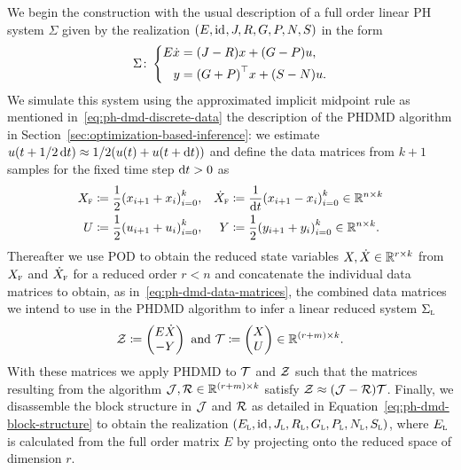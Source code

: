 We begin the construction with the usual description of a full order linear \ac{PH} system $\Sigma$ given by the realization $(E, \text{id}_{}, J, R, G, P, N, S)$ in the form
\begin{equation*}
    \Sigma \colon \left\lbrace
    \begin{aligned}
        E \dot{x} &= (J - R) x + (G - P) u, \\
        y &= {(G + P)}^{\top} x + (S - N) u.
    \end{aligned}
    \right.
\end{equation*}
We simulate this system using the approximated implicit midpoint rule as mentioned in~\eqref{eq:ph-dmd-discrete-data} the description of the \ac{PHDMD} algorithm in Section~\ref{sec:optimization-based-inference}: we estimate $u(t + 1 / 2 \mathop{}\!\mathrm{d} t) \approx 1 / 2 (u(t) + u(t + \mathop{}\!\mathrm{d} t))$ and define the data matrices from $k + 1$ samples for the fixed time step $\mathop{}\!\mathrm{d} t > 0$ as
\begin{equation}\label{eq:quad-fom-discrete-data}
    \begin{alignedat}{3}
        X_{\textnormal{\scshape f}} &\coloneqq \frac{1}{2} {\left( x_{i + 1} + x_i \right)}_{i = 0}^k,\quad &\dot{X}_{\textnormal{\scshape f}} &\coloneqq \frac{1}{\mathop{}\!\mathrm{d} t} {\left( x_{i + 1} - x_i \right)}_{i = 0}^k \in \mathbb{R}^{n \times k} \\
        U &\coloneqq \frac{1}{2} {\left( u_{i + 1} + u_i \right)}_{i = 0}^k,\quad &Y &\coloneqq \frac{1}{2} {\left( y_{i + 1} + y_i \right)}_{i = 0}^k \in \mathbb{R}^{n \times k}.
    \end{alignedat}
\end{equation}
Thereafter we use \ac{POD} to obtain the reduced state variables $X, \dot{X} \in \mathbb{R}^{r \times k}$ from $X_{\textnormal{\scshape f}}$ and $\dot{X}_{\textnormal{\scshape f}}$ for a reduced order $r < n$ and concatenate the individual data matrices to obtain, as in~\eqref{eq:ph-dmd-data-matrices}, the combined data matrices we intend to use in the \ac{PHDMD} algorithm to infer a linear reduced system $\Sigma_{\textnormal{\scshape l}}$
\begin{equation*}
    \mathcal{Z} \coloneqq \begin{pmatrix}
        E \dot{X} \\
        -Y
    \end{pmatrix} \text{ and } \mathcal{T} \coloneqq \begin{pmatrix}
        X \\
        U
    \end{pmatrix} \in \mathbb{R}^{(r + m) \times k}.
\end{equation*}
With these matrices we apply \ac{PHDMD} to $\mathcal{T}$ and $\mathcal{Z}$ such that the matrices resulting from the algorithm $\mathcal{J}, \mathcal{R} \in \mathbb{R}^{(r + m) \times k}$ satisfy $\mathcal{Z} \approx (\mathcal{J} - \mathcal{R}) \mathcal{T}$.
Finally, we disassemble the block structure in $\mathcal{J}$ and $\mathcal{R}$ as detailed in Equation~\eqref{eq:ph-dmd-block-structure} to obtain the realization $(E_{\textnormal{\scshape l}}, \text{id}_{}, J_{\textnormal{\scshape l}}, R_{\textnormal{\scshape l}}, G_{\textnormal{\scshape l}}, P_{\textnormal{\scshape l}}, N_{\textnormal{\scshape l}}, S_{\textnormal{\scshape l}})$, where $E_{\textnormal{\scshape l}}$ is calculated from the full order matrix $E$ by projecting onto the reduced space of dimension $r$.


